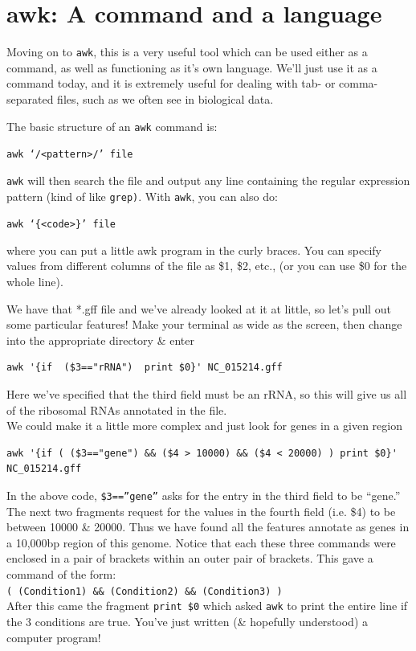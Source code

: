 \documentclass[a4paper,12pt,twoside]{memoir}
\begin{document}
\section{awk: A command and a language}
Moving on to \texttt{awk}, this is a very useful tool which can be used either as a command, as well as functioning as it's own language.
We'll just use it as a command today, and it is extremely useful for dealing with tab- or comma-separated files, such as we often see in biological data.\\
\begin{information}
The basic structure of an \texttt{awk} command is: 
\begin{center}
\texttt{awk `/<pattern>/' file} 
\end{center}
\texttt{awk} will then search the file and output any line containing the regular expression pattern (kind of like \texttt{grep)}.
With \texttt{awk}, you can also do: 
\begin{center}
\texttt{awk `\{<code>\}' file} 
\end{center}
where you can put a little awk program in the curly braces. 
You can specify values from different columns of the file as \$1, \$2, etc., (or you can use \$0 for the whole line).
\end{information}

\begin{steps}
We have that *.gff file and we've already looked at it at little, so let's pull out some particular features!
Make your terminal as wide as the screen, then change into the appropriate directory \& enter
\begin{lstlisting}
awk '{if  ($3=="rRNA")  print $0}' NC_015214.gff
\end{lstlisting}
Here we've specified that the third field must be an rRNA, so this will give us all of the ribosomal RNAs annotated in the file. \\

We could make it a little more complex and just look for genes in a given region
\begin{lstlisting}
awk '{if ( ($3=="gene") && ($4 > 10000) && ($4 < 20000) ) print $0}' NC_015214.gff
\end{lstlisting}
\end{steps}
\begin{note}
In the above code, \texttt{\$3==''gene''} asks for the entry in the third field to be ``gene.''
The next two fragments request for the values in the fourth field (i.e. \$4) to be between 10000 \& 20000.
Thus we have found all the features annotate as genes in a 10,000bp region of this genome.
Notice that each these three commands were enclosed in a pair of brackets within an outer pair of brackets.
This gave a command of the form: \\
\texttt{( (Condition1) \&\& (Condition2) \&\& (Condition3) )} \\
After this came the fragment \texttt{print \$0} which asked \texttt{awk} to print the entire line if the 3 conditions are true.
You've just written (\& hopefully understood) a computer program!
\end{note}
\end{document}
